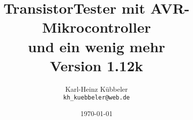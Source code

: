 \documentclass[pdftex,12pt,a4paper,oneside,english]{report}
\begin{document}
\newcommand\electricC {
\hspace{-14 pt}
\begin{circuitikz}
\draw (0,0) to[capacitor] (0:1);
\end{circuitikz}
\hspace{-6 pt}
}
\newcommand\electricR {
\hspace{-14 pt}
\begin{circuitikz}
\draw (0,0) to[european resistor] (0:1);
\end{circuitikz}
\hspace{-6 pt}
}
\newcommand\electricL {
\hspace{-14 pt}
\begin{circuitikz}
\draw (0,0) 
 to[american inductor] (-1,0) 
;\end{circuitikz}
\hspace{-6 pt}
}
\newcommand\electricDAK {
\begin{circuitikz}
\draw (0,0) to[full diode] (0:1);
\end{circuitikz}
}
\newcommand\electricDKA {
\begin{circuitikz}
\draw (0,0) to[full diode] (180:1);
\end{circuitikz}
}
\title{TransistorTester mit AVR-Mikrocontroller \\
und ein wenig mehr\\
Version 1.12k \\
}
\author{Karl-Heinz Kübbeler\\
\texttt{kh\_kuebbeler@web.de}}
\date{\today}
\maketitle
\tableofcontents













 
 
 
 
 
 





\end{document}
